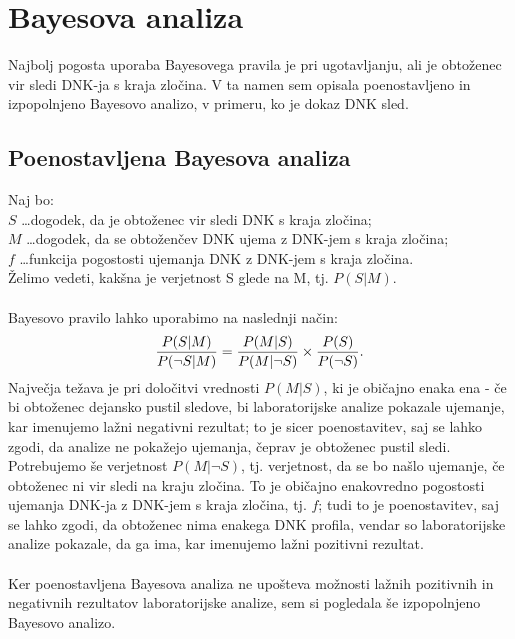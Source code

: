 \documentclass[12pt,a4paper]{amsart}
\theoremstyle{definition} %
\theoremstyle{plain} %
\begin{document}
\section{Bayesova analiza}
Najbolj pogosta uporaba Bayesovega pravila je pri ugotavljanju, ali je obtoženec vir sledi DNK-ja s kraja zločina. V ta namen sem opisala 
poenostavljeno in izpopolnjeno Bayesovo analizo, v primeru, ko je dokaz DNK sled.

\subsection{Poenostavljena Bayesova analiza}
Naj bo:\\
$S$ \dots dogodek, da je obtoženec vir sledi DNK s kraja zločina; \\
$M$ \dots dogodek, da se obtoženčev DNK ujema z DNK-jem s kraja zločina; \\
$f$ \dots funkcija pogostosti ujemanja DNK z DNK-jem s kraja zločina. \\
Želimo vedeti, kakšna je verjetnost S glede na M, tj. $P(S \lvert M)$. \\\\
Bayesovo pravilo lahko uporabimo na naslednji način:
\[
   \frac{P(S \lvert M)}{P(\neg S \lvert M)} = \frac{P(M \lvert S)}{P(M \lvert \neg S)} \times \frac{P(S)}{P(\neg S)}. \vspace{2mm}
\]
Največja težava je pri določitvi vrednosti $P(M \lvert S)$, ki je običajno enaka ena - če bi obtoženec dejansko pustil sledove, bi laboratorijske 
analize pokazale ujemanje, kar imenujemo lažni negativni rezultat; to je sicer poenostavitev, saj se lahko zgodi, da analize ne pokažejo ujemanja, 
čeprav je obtoženec pustil sledi. \\
Potrebujemo še verjetnost $P(M \lvert \neg S)$, tj. verjetnost, da se bo našlo ujemanje, če obtoženec ni vir sledi na kraju zločina. To je
običajno enakovredno pogostosti ujemanja DNK-ja z DNK-jem s kraja zločina, tj. $f$; tudi to je poenostavitev, saj se lahko zgodi, da
obtoženec nima enakega DNK profila, vendar so laboratorijske analize pokazale, da ga ima, kar imenujemo lažni pozitivni rezultat.\\\\
Ker poenostavljena Bayesova analiza ne upošteva možnosti lažnih pozitivnih in negativnih rezultatov laboratorijske analize, sem si pogledala še 
izpopolnjeno Bayesovo analizo.
\end{document}

